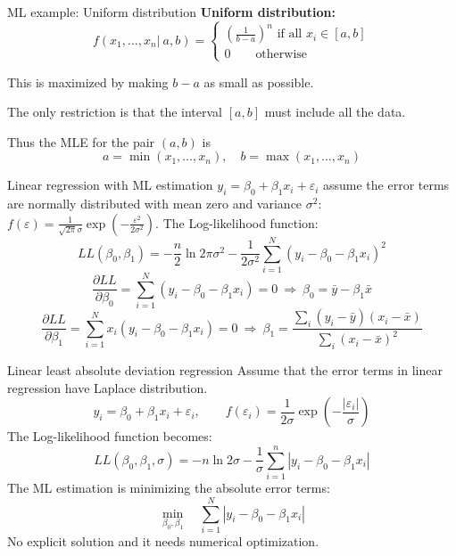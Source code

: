 \documentclass{beamer}
\begin{document}
\begin{frame}{ML example: Uniform distribution}
\textbf{Uniform distribution:}
\[ f(x_1,\dots,x_n|\ a,b)=\begin{cases}
(\frac{1}{b-a})^n\text{ if all }x_i \in [a,b] \\
0\qquad \text{otherwise}
\end{cases}  \]\bigskip \pause

This is maximized by making $b - a$ as small as possible. \bigskip

The only restriction is that the interval $[a, b]$ must include all the data. \bigskip

Thus the MLE for the pair $(a, b)$ is
\[a=\min(x_1,\dots,x_n),\quad b = \max(x_1,\dots, x_n)\]
\end{frame}

\begin{frame}{Linear regression with ML estimation}
$y_i=\beta_0+\beta_1 x_i+\varepsilon_i$ assume the error terms are normally distributed with mean zero and variance $\sigma^2$:  $f(\varepsilon)=\frac{1}{\sqrt{2\pi}\sigma}\exp(-\frac{\varepsilon^2}{2\sigma^2})$. 
The Log-likelihood function:
\[ LL(\beta_0,\beta_1)=-\frac{n}{2}\ln 2\pi\sigma^2-\frac{1}{2\sigma^2}\sum_{i=1}^N(y_i-\beta_0-\beta_1x_i)^2  \]
\[ \frac{\partial LL}{\partial \beta_0}=\sum_{i=1}^N (y_i-\beta_0-\beta_1 x_i)=0 \ \Rightarrow \ \beta_0=\bar{y}-\beta_1 \bar{x} \]
\[ \frac{\partial LL}{\partial \beta_1}=\sum_{i=1}^N x_i(y_i-\beta_0-\beta_1 x_i)=0 \ \Rightarrow \ \beta_1=\frac{\sum_{i}(y_i-\bar{y})(x_i-\bar{x})}{\sum_{i}(x_i- \bar{x})^2 } \]
\end{frame}

\begin{frame}{Linear least absolute deviation regression}
Assume that the error terms in linear regression have Laplace distribution. \[y_i=\beta_0+\beta_1x_i+\varepsilon_i,\qquad  f(\varepsilon_i)=\frac{1}{2\sigma}\exp(-\frac{|\varepsilon_i|}{\sigma}) \]
The Log-likelihood function becomes:
\[L\!L(\beta_0,\beta_1,\sigma)=-n\ln 2\sigma-\frac{1}{\sigma}\sum_{i=1}^n|y_i-\beta_0-\beta_1x_i| \]
The ML estimation is minimizing the absolute error terms:
\[\min_{\beta_0,\beta_1} \quad \sum_{i=1}^N |y_i-\beta_0-\beta_1x_i| \] 
No explicit solution and it needs numerical optimization.
\end{frame}
\end{document}
